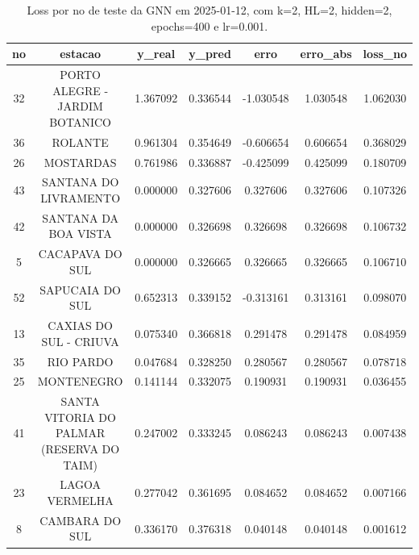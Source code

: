 \begin{table}[h]
\centering
\caption{Loss por no de teste da GNN em 2025-01-12, com k=2, HL=2, hidden=2, epochs=400 e lr=0.001.}
\label{tab:gnn_loss_k2_hl2_h2_e400_d20250112}
\begin{tabular}{ccccccc}
\toprule
no & estacao & y\_real & y\_pred & erro & erro\_abs & loss\_no \\
\midrule
32 & PORTO ALEGRE - JARDIM BOTANICO & 1.367092 & 0.336544 & -1.030548 & 1.030548 & 1.062030 \\
36 & ROLANTE & 0.961304 & 0.354649 & -0.606654 & 0.606654 & 0.368029 \\
26 & MOSTARDAS & 0.761986 & 0.336887 & -0.425099 & 0.425099 & 0.180709 \\
43 & SANTANA DO LIVRAMENTO & 0.000000 & 0.327606 & 0.327606 & 0.327606 & 0.107326 \\
42 & SANTANA DA BOA VISTA & 0.000000 & 0.326698 & 0.326698 & 0.326698 & 0.106732 \\
5 & CACAPAVA DO SUL & 0.000000 & 0.326665 & 0.326665 & 0.326665 & 0.106710 \\
52 & SAPUCAIA DO SUL & 0.652313 & 0.339152 & -0.313161 & 0.313161 & 0.098070 \\
13 & CAXIAS DO SUL - CRIUVA & 0.075340 & 0.366818 & 0.291478 & 0.291478 & 0.084959 \\
35 & RIO PARDO & 0.047684 & 0.328250 & 0.280567 & 0.280567 & 0.078718 \\
25 & MONTENEGRO & 0.141144 & 0.332075 & 0.190931 & 0.190931 & 0.036455 \\
41 & SANTA VITORIA DO PALMAR (RESERVA DO TAIM) & 0.247002 & 0.333245 & 0.086243 & 0.086243 & 0.007438 \\
23 & LAGOA VERMELHA & 0.277042 & 0.361695 & 0.084652 & 0.084652 & 0.007166 \\
8 & CAMBARA DO SUL & 0.336170 & 0.376318 & 0.040148 & 0.040148 & 0.001612 \\
\bottomrule
\end{tabular}
\end{table}
